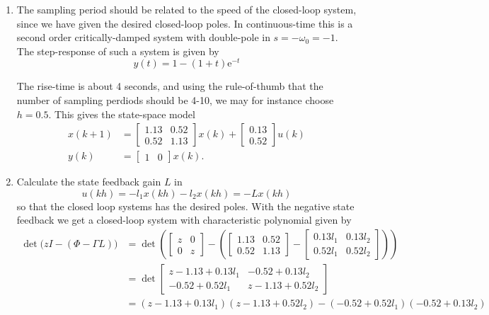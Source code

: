 \documentclass[letterpaper,12pt]{article}
\newcommand{\bbm}{\begin{bmatrix}}
\newcommand{\ebm}{\end{bmatrix}}
\newcommand*{\mexp}[1]{\ensuremath{\mathrm{e}^{#1}}}
\begin{document}
\begin{enumerate}
\item The sampling period should be related to the speed of the closed-loop system, since we have given the desired closed-loop poles. In continuous-time this is a second order critically-damped system with double-pole in $s=-\omega_0=-1$. The step-response of such a system is given by \[ y(t) = 1 - (1+t)\mexp{-t}\]
  \begin{center}
  \end{center}
  The rise-time is about 4 seconds, and using the rule-of-thumb that the number of sampling perdiods should be 4-10, we may for instance choose $h=0.5$. This gives the state-space model
  \begin{equation*}
    \begin{aligned}
      x(k+1) &= \bbm 1.13 & 0.52\\0.52 & 1.13 \ebm x(k) + \bbm 0.13\\0.52 \ebm u(k)\\
      y(k) &= \bbm 1 & 0 \ebm x(k).
    \end{aligned}
  \end{equation*}
\item Calculate the state feedback gain $L$ in 
  \[ u(kh) = -l_1 x(kh) - l_2 x(kh) = -L x(kh)\]
  so that the closed loop systems has the desired poles. With the negative state feedback we get a closed-loop system with characteristic polynomial given by 
  \begin{equation*}
    \begin{aligned}
      \det \big(zI - (\Phi - \Gamma L)\big) &= \det \left( \bbm z & 0\\ 0 & z\ebm - \left(\bbm 1.13 & 0.52\\0.52 & 1.13 \ebm - \bbm 0.13 l_1 & 0.13 l_2\\ 0.52 l_1 & 0.52 l_2 \ebm\right)\right)\\
      &= \det \bbm z-1.13+0.13l_1 & -0.52+0.13l_2\\ -0.52 + 0.52l_1 & z-1.13+0.52l_2 \ebm\\
      &= (z-1.13+0.13l_1)(z-1.13+0.52l_2) - (-0.52 + 0.52l_1)(-0.52+0.13l_2)\\

\end{aligned}
\end{equation*}
\end{enumerate}
\end{document}

